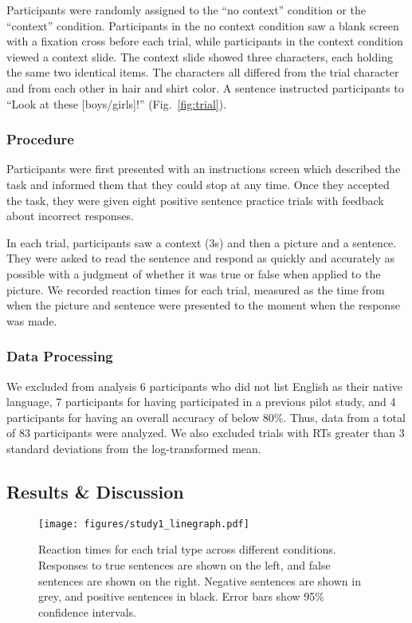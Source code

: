 \documentclass[man]{apa2}
\begin{document}
Participants were randomly assigned to the ``no context'' condition or the ``context'' condition.  Participants in the no context condition saw a blank screen with a fixation cross before each trial, while participants in the context condition viewed a context slide.  The context slide showed three characters, each holding the same two identical items.  The characters all differed from the trial character and from each other in hair and shirt color.  A sentence instructed participants to ``Look at these [boys/girls]!'' (Fig.\ \ref{fig:trial}).  


\subsubsection{Procedure}
Participants were first presented with an instructions screen which described the task and informed them that they could stop at any time.  Once they accepted the task, they were given eight positive sentence practice trials with feedback about incorrect responses. 

In each trial, participants saw a context (3s) and then a picture and a sentence. They were asked to read the sentence and respond as quickly and accurately as possible with a judgment of whether it was true or false when applied to the picture.  We recorded reaction times for each trial, measured as the time from when the picture and sentence were presented to the moment when the response was made.

\subsubsection{Data Processing}
We excluded from analysis 6 participants who did not list English as their native language, 7 participants for having participated in a previous pilot study, and 4 participants for having an overall accuracy of below 80\%.  Thus, data from a total of 83 participants were analyzed.  We also excluded trials with RTs greater than 3 standard deviations from the log-transformed mean.  

\subsection{Results \& Discussion}

\begin{figure}
\begin{center} 
\texttt{[image: figures/study1\_linegraph.pdf]}
\caption{\label{fig:e1line} Reaction times for each trial type across different conditions.  Responses to true sentences are shown on the left, and false sentences are shown on the right.  Negative sentences are shown in grey, and positive sentences in black.  Error bars show 95\% confidence intervals.}
\end{center} 
\end{figure}
\end{document}
